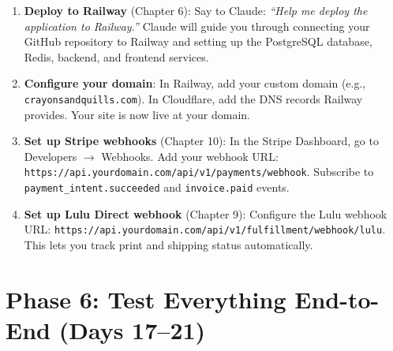 \documentclass[12pt, letterpaper, oneside]{book}
\begin{document}
\begin{enumerate}[leftmargin=2em, itemsep=6pt, start=20]
  \item \textbf{Deploy to Railway} (Chapter 6): Say to Claude: \textit{``Help me deploy the application to Railway.''} Claude will guide you through connecting your GitHub repository to Railway and setting up the PostgreSQL database, Redis, backend, and frontend services.

  \item \textbf{Configure your domain}: In Railway, add your custom domain (e.g., \texttt{crayonsandquills.com}). In Cloudflare, add the DNS records Railway provides. Your site is now live at your domain.

  \item \textbf{Set up Stripe webhooks} (Chapter 10): In the Stripe Dashboard, go to Developers $\rightarrow$ Webhooks. Add your webhook URL: \texttt{https://api.yourdomain.com/api/v1/payments/webhook}. Subscribe to \texttt{payment\_intent.succeeded} and \texttt{invoice.paid} events.

  \item \textbf{Set up Lulu Direct webhook} (Chapter 9): Configure the Lulu webhook URL: \texttt{https://api.yourdomain.com/api/v1/fulfillment/webhook/lulu}. This lets you track print and shipping status automatically.
\end{enumerate}

\section{Phase 6: Test Everything End-to-End (Days 17--21)}
\end{document}
